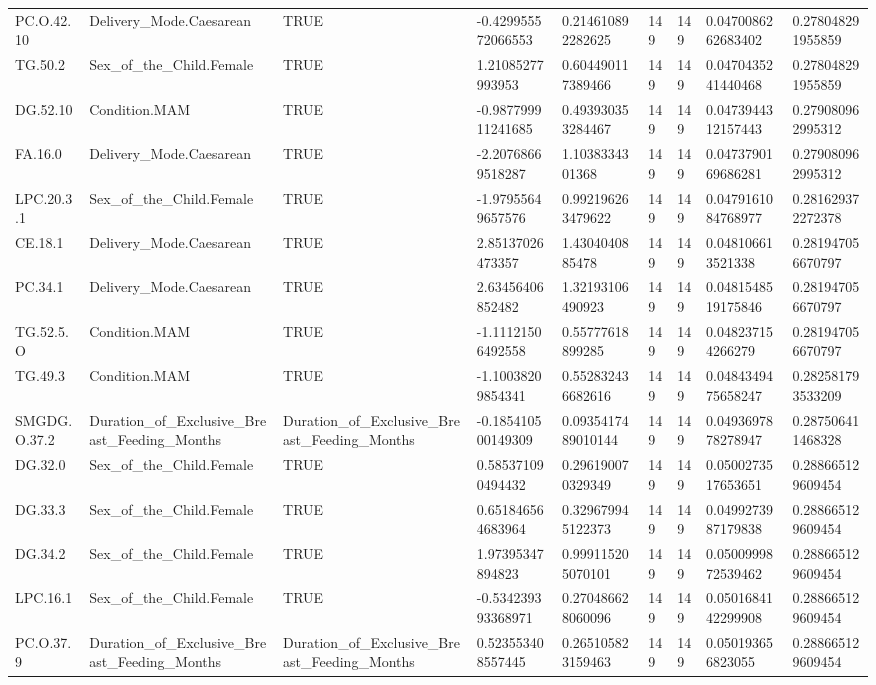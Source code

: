 \begin{longtable}{lllllllll}
PC.O.42.10 & Delivery\_Mode.Caesarean & TRUE & -0.429955572066553 & 0.214610892282625 & 149 & 149 & 0.0470086262683402 & 0.278048291955859 \\
TG.50.2 & Sex\_of\_the\_Child.Female & TRUE & 1.21085277993953 & 0.604490117389466 & 149 & 149 & 0.0470435241440468 & 0.278048291955859 \\
DG.52.10 & Condition.MAM & TRUE & -0.987799911241685 & 0.493930353284467 & 149 & 149 & 0.0473944312157443 & 0.279080962995312 \\
FA.16.0 & Delivery\_Mode.Caesarean & TRUE & -2.20768669518287 & 1.1038334301368 & 149 & 149 & 0.0473790169686281 & 0.279080962995312 \\
LPC.20.3.1 & Sex\_of\_the\_Child.Female & TRUE & -1.97955649657576 & 0.992196263479622 & 149 & 149 & 0.0479161084768977 & 0.281629372272378 \\
CE.18.1 & Delivery\_Mode.Caesarean & TRUE & 2.85137026473357 & 1.4304040885478 & 149 & 149 & 0.048106613521338 & 0.281947056670797 \\
PC.34.1 & Delivery\_Mode.Caesarean & TRUE & 2.63456406852482 & 1.32193106490923 & 149 & 149 & 0.0481548519175846 & 0.281947056670797 \\
TG.52.5.O & Condition.MAM & TRUE & -1.11121506492558 & 0.55777618899285 & 149 & 149 & 0.048237154266279 & 0.281947056670797 \\
TG.49.3 & Condition.MAM & TRUE & -1.10038209854341 & 0.552832436682616 & 149 & 149 & 0.0484349475658247 & 0.282581793533209 \\
SMGDG.O.37.2 & Duration\_of\_Exclusive\_Breast\_Feeding\_Months & Duration\_of\_Exclusive\_Breast\_Feeding\_Months & -0.185410500149309 & 0.0935417489010144 & 149 & 149 & 0.0493697878278947 & 0.287506411468328 \\
DG.32.0 & Sex\_of\_the\_Child.Female & TRUE & 0.585371090494432 & 0.296190070329349 & 149 & 149 & 0.0500273517653651 & 0.288665129609454 \\
DG.33.3 & Sex\_of\_the\_Child.Female & TRUE & 0.651846564683964 & 0.329679945122373 & 149 & 149 & 0.0499273987179838 & 0.288665129609454 \\
DG.34.2 & Sex\_of\_the\_Child.Female & TRUE & 1.97395347894823 & 0.999115205070101 & 149 & 149 & 0.0500999872539462 & 0.288665129609454 \\
LPC.16.1 & Sex\_of\_the\_Child.Female & TRUE & -0.534239393368971 & 0.270486628060096 & 149 & 149 & 0.0501684142299908 & 0.288665129609454 \\
PC.O.37.9 & Duration\_of\_Exclusive\_Breast\_Feeding\_Months & Duration\_of\_Exclusive\_Breast\_Feeding\_Months & 0.523553408557445 & 0.265105823159463 & 149 & 149 & 0.050193656823055 & 0.288665129609454 \\

\end{longtable}

